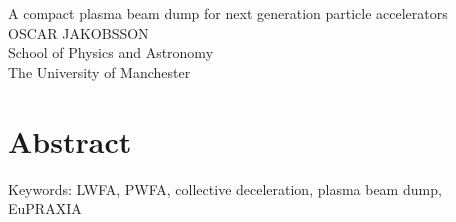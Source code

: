 A compact plasma beam dump for next generation particle accelerators \\
OSCAR JAKOBSSON\\
School of Physics and Astronomy\\
The University of Manchester \setlength{\parskip}{0.5cm}

\thispagestyle{plain}			%
\setlength{\parskip}{0pt plus 1.0pt}
\section*{Abstract}

\vfill
Keywords: LWFA, PWFA, collective deceleration, plasma beam dump, EuPRAXIA

